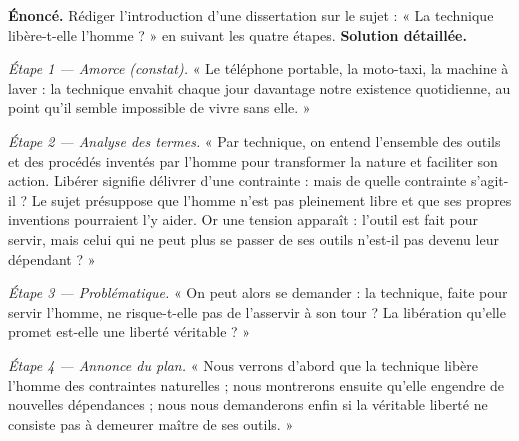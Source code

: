 \documentclass[11pt]{article}
\begin{document}
\begin{exoresolu}
\textbf{Énoncé.} Rédiger l'introduction d'une dissertation sur le sujet : « La technique libère-t-elle l'homme ? » en suivant les quatre étapes.
\tcblower
\textbf{Solution détaillée.}

\emph{Étape 1 — Amorce (constat).} « Le téléphone portable, la moto-taxi, la machine à laver : la technique envahit chaque jour davantage notre existence quotidienne, au point qu'il semble impossible de vivre sans elle. »

\emph{Étape 2 — Analyse des termes.} « Par technique, on entend l'ensemble des outils et des procédés inventés par l'homme pour transformer la nature et faciliter son action. Libérer signifie délivrer d'une contrainte : mais de quelle contrainte s'agit-il ? Le sujet présuppose que l'homme n'est pas pleinement libre et que ses propres inventions pourraient l'y aider. Or une tension apparaît : l'outil est fait pour servir, mais celui qui ne peut plus se passer de ses outils n'est-il pas devenu leur dépendant ? »

\emph{Étape 3 — Problématique.} « On peut alors se demander : la technique, faite pour servir l'homme, ne risque-t-elle pas de l'asservir à son tour ? La libération qu'elle promet est-elle une liberté véritable ? »

\emph{Étape 4 — Annonce du plan.} « Nous verrons d'abord que la technique libère l'homme des contraintes naturelles ; nous montrerons ensuite qu'elle engendre de nouvelles dépendances ; nous nous demanderons enfin si la véritable liberté ne consiste pas à demeurer maître de ses outils. »
\end{exoresolu}
\end{document}
